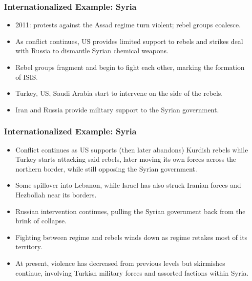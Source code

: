 \documentclass{beamer}
\begin{document}
\begin{frame} 
	\frametitle{\LARGE{Internationalized Example: Syria}}
	\begin{itemize}
		\item 2011: protests against the Assad regime turn violent; rebel groups coalesce. \pause
		\item As conflict continues, US provides limited support to rebels and strikes deal with Russia to dismantle Syrian chemical weapons.\pause
		\item Rebel groups fragment and begin to fight each other, marking the formation of ISIS.\pause
		\item Turkey, US, Saudi Arabia start to intervene on the side of the rebels.\pause
		\item Iran and Russia provide military support to the Syrian government.
	\end{itemize}
\end{frame}

\begin{frame} 
	\frametitle{\LARGE{Internationalized Example: Syria}}
	\begin{itemize}
		\item Conflict continues as US supports (then later abandons) Kurdish rebels while Turkey starts attacking said rebels, later moving its own forces across the northern border, while still opposing the Syrian government. \pause
		\item Some spillover into Lebanon, while Israel has also struck Iranian forces and Hezbollah near its borders. \pause
		\item Russian intervention continues, pulling the Syrian government back from the brink of collapse. \pause
		\item Fighting between regime and rebels winds down as regime retakes most of its territory. \pause
		\item At present, violence has decreased from previous levels but skirmishes continue, involving Turkish military forces and assorted factions within Syria.
		
	\end{itemize}
\end{frame}
\end{document}
